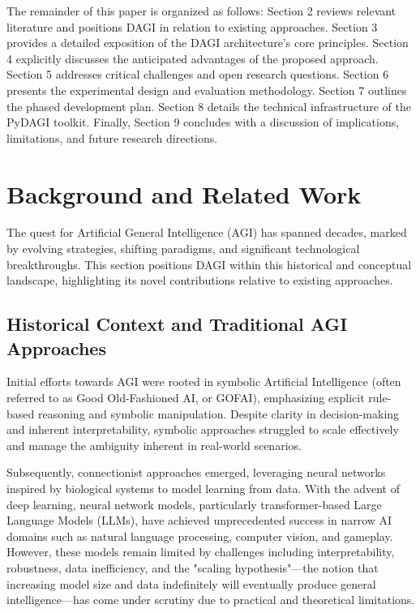 \documentclass[12pt]{amsart}
\begin{document}
The remainder of this paper is organized as follows: Section 2 reviews relevant literature and positions DAGI in relation to existing approaches. Section 3 provides a detailed exposition of the DAGI architecture's core principles. Section 4 explicitly discusses the anticipated advantages of the proposed approach. Section 5 addresses critical challenges and open research questions. Section 6 presents the experimental design and evaluation methodology. Section 7 outlines the phased development plan. Section 8 details the technical infrastructure of the PyDAGI toolkit. Finally, Section 9 concludes with a discussion of implications, limitations, and future research directions.



\section{Background and Related Work}
The quest for Artificial General Intelligence (AGI) has spanned decades, marked by evolving strategies, shifting paradigms, and significant technological breakthroughs. This section positions DAGI within this historical and conceptual landscape, highlighting its novel contributions relative to existing approaches.

\subsection{Historical Context and Traditional AGI Approaches}
Initial efforts towards AGI were rooted in symbolic Artificial Intelligence (often referred to as Good Old-Fashioned AI, or GOFAI), emphasizing explicit rule-based reasoning and symbolic manipulation. Despite clarity in decision-making and inherent interpretability, symbolic approaches struggled to scale effectively and manage the ambiguity inherent in real-world scenarios.

Subsequently, connectionist approaches emerged, leveraging neural networks inspired by biological systems to model learning from data. With the advent of deep learning, neural network models, particularly transformer-based Large Language Models (LLMs), have achieved unprecedented success in narrow AI domains such as natural language processing, computer vision, and gameplay. However, these models remain limited by challenges including interpretability, robustness, data inefficiency, and the "scaling hypothesis"—the notion that increasing model size and data indefinitely will eventually produce general intelligence—has come under scrutiny due to practical and theoretical limitations.
\end{document}
